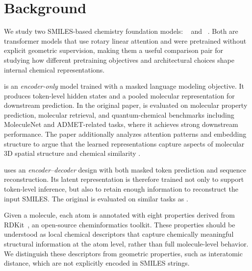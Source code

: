 \section{Background}
\label{sec:background}

We study two SMILES-based chemistry foundation models: \molm~\citep{ross2022largescalechemicallanguagerepresentations} and \smi~\citep{soares2024smi}. Both are transformer models that use rotary linear attention and were pretrained without explicit geometric supervision, making them a useful comparison pair for studying how different pretraining objectives and architectural choices shape internal chemical representations.

\molm is an \textit{encoder-only} model trained with a masked language modeling objective. It produces token-level hidden states and a pooled molecular representation for downstream prediction. In the original paper, \molm is evaluated on molecular property prediction, molecular retrieval, and quantum-chemical benchmarks including MoleculeNet and ADMET-related tasks, where it achieves strong downstream performance. The paper additionally analyzes attention patterns and embedding structure to argue that the learned representations capture aspects of molecular 3D spatial structure and chemical similarity \citep{ross2022largescalechemicallanguagerepresentations,wu2018moleculenet}. 

\smi uses an \textit{encoder--decoder} design with both masked token prediction and sequence reconstruction. Its latent representation is therefore trained not only to support token-level inference, but also to retain enough information to reconstruct the input SMILES. The original \smi is evaluated on similar tasks as \molm \citep{soares2024smi,wu2018moleculenet}.

 Given a molecule, each atom is annotated with eight properties derived from RDKit~\cite{rdkit}, an open-source cheminformatics toolkit. These properties should be understood as local chemical descriptors that capture chemically meaningful structural information at the atom level, rather than full molecule-level behavior. We distinguish these descriptors from geometric properties, such as interatomic distance, which are not explicitly encoded in SMILES strings.

